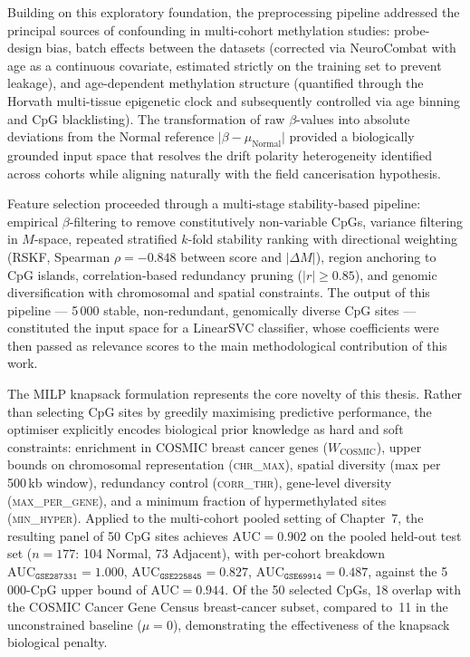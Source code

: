 Building on this exploratory foundation, the preprocessing pipeline
addressed the principal sources of confounding in multi-cohort methylation
studies: probe-design bias,
batch effects between the datasets (corrected via NeuroCombat with age as a
continuous covariate, estimated strictly on the training set to prevent
leakage), and age-dependent methylation structure (quantified through the
Horvath multi-tissue epigenetic clock and subsequently controlled via age
binning and CpG blacklisting).
The transformation of raw $\beta$-values into absolute deviations from the
Normal reference $\lvert\beta - \mu_{\mathrm{Normal}}\rvert$ provided a
biologically grounded input space that resolves the drift polarity
heterogeneity identified across cohorts while aligning naturally with the
field cancerisation hypothesis.

Feature selection proceeded through a multi-stage stability-based pipeline:
empirical $\beta$-filtering to remove constitutively non-variable CpGs,
variance filtering in $M$-space, repeated stratified $k$-fold stability
ranking with directional weighting (RSKF, Spearman
$\rho = -0.848$ between score and $|\Delta M|$), region anchoring to CpG
islands, correlation-based redundancy pruning ($|r| \geq 0.85$), and
genomic diversification with chromosomal and spatial constraints.
The output of this pipeline --- 5\,000 stable, non-redundant, genomically
diverse CpG sites --- constituted the input space for a LinearSVC
classifier, whose coefficients
were then passed as relevance scores to the main methodological contribution
of this work.

The MILP knapsack formulation represents the core novelty of this thesis.
Rather than selecting CpG sites by greedily maximising predictive
performance, the optimiser explicitly encodes biological prior knowledge as
hard and soft constraints: enrichment in COSMIC breast cancer genes
($W_{\mathrm{COSMIC}}$), upper bounds on chromosomal representation
(\textsc{chr\_max}), spatial diversity (max per 500\,kb window), redundancy
control (\textsc{corr\_thr}), gene-level diversity (\textsc{max\_per\_gene}),
and a minimum fraction of hypermethylated sites (\textsc{min\_hyper}).
Applied to the multi-cohort pooled setting of Chapter~7, the resulting panel
of 50 CpG sites achieves $\mathrm{AUC} = 0.902$ on the pooled held-out test
set ($n = 177$: 104 Normal, 73 Adjacent), with per-cohort breakdown
$\mathrm{AUC}_{\texttt{GSE287331}} = 1.000$,
$\mathrm{AUC}_{\texttt{GSE225845}} = 0.827$,
$\mathrm{AUC}_{\texttt{GSE69914}} = 0.487$,
against the 5\,000-CpG upper bound of $\mathrm{AUC} = 0.944$.
Of the 50 selected CpGs, 18 overlap with the COSMIC Cancer Gene Census
breast-cancer subset, compared to~11 in the unconstrained baseline
($\mu = 0$), demonstrating the effectiveness of the knapsack biological
penalty.

